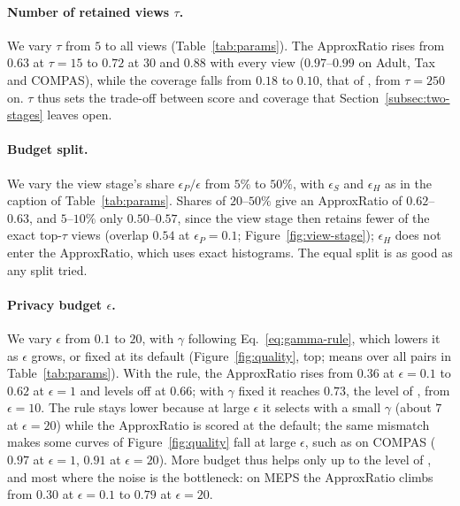 \paragraph{Number of retained views $\tau$.}
We vary $\tau$ from $5$ to all views (Table~\ref{tab:params}).
The ApproxRatio rises from $0.63$ at $\tau=15$ to $0.72$ at $30$ and $0.88$ with every view ($0.97$--$0.99$ on Adult, Tax and COMPAS), while the coverage falls from $0.18$ to $0.10$, that of \BF{}, from $\tau=250$ on.
$\tau$ thus sets the trade-off between score and coverage that Section~\ref{subsec:two-stages} leaves open.

\paragraph{Budget split.}
We vary the view stage's share $\epsilon_P/\epsilon$ from $5\%$ to $50\%$, with $\epsilon_S$ and $\epsilon_H$ as in the caption of Table~\ref{tab:params}.
Shares of $20$--$50\%$ give an ApproxRatio of $0.62$--$0.63$, and $5$--$10\%$ only $0.50$--$0.57$, since the view stage then retains fewer of the exact top-$\tau$ views (overlap $0.54$ at $\epsilon_P=0.1$; Figure~\ref{fig:view-stage}); $\epsilon_H$ does not enter the ApproxRatio, which uses exact histograms.
The equal split is as good as any split tried.

\paragraph{Privacy budget $\epsilon$.}
We vary $\epsilon$ from $0.1$ to $20$, with $\gamma$ following Eq.~\eqref{eq:gamma-rule}, which lowers it as $\epsilon$ grows, or fixed at its default (Figure~\ref{fig:quality}, top; means over all pairs in Table~\ref{tab:params}).
With the rule, the ApproxRatio rises from $0.36$ at $\epsilon=0.1$ to $0.62$ at $\epsilon=1$ and levels off at $0.66$; with $\gamma$ fixed it reaches $0.73$, the level of \Bone{}, from $\epsilon=10$.
The rule stays lower because at large $\epsilon$ it selects with a small $\gamma$ (about $7$ at $\epsilon=20$) while the ApproxRatio is scored at the default; the same mismatch makes some curves of Figure~\ref{fig:quality} fall at large $\epsilon$, such as \SingleStage{} on COMPAS ($0.97$ at $\epsilon=1$, $0.91$ at $\epsilon=20$).
More budget thus helps only up to the level of \Bone{}, and most where the noise is the bottleneck: on MEPS the ApproxRatio climbs from $0.30$ at $\epsilon=0.1$ to $0.79$ at $\epsilon=20$.

